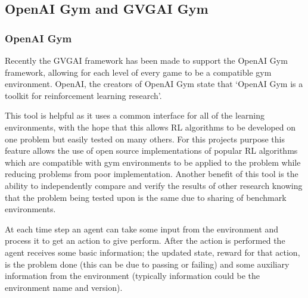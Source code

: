\documentclass[a4paper]{article}
\begin{document}
\subsection{OpenAI Gym and GVGAI Gym}
\subsubsection{OpenAI Gym}
Recently the GVGAI framework has been made to support the OpenAI Gym framework, allowing for each level of every game to be a compatible gym environment.
OpenAI, the creators of OpenAI Gym state that `OpenAI Gym is a toolkit for reinforcement learning research'\cite{OpenAIGym}.
\par
This tool is helpful as it uses a common interface for all of the learning environments, with the hope that this allows RL algorithms to be developed on one problem but easily tested on many others.
For this projects purpose this feature allows the use of open source implementations of popular RL algorithms which are compatible with gym environments to be applied to the problem while reducing problems from poor implementation.
Another benefit of this tool is the ability to independently compare and verify the results of other research knowing that the problem being tested upon is the same due to sharing of benchmark environments.
\par
At each time step an agent can take some input from the environment and process it to get an action to give perform.
After the action is performed the agent receives some basic information; the updated state, reward for that action, is the problem done (this can be due to passing or failing) and some auxiliary information from the environment (typically information could be the environment name and version).
\end{document}
